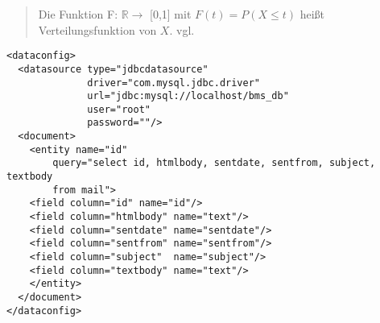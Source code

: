 \begin{quote}
	Die Funktion F: $\mathbb{R} \rightarrow$ [0,1] mit $F(t) = P (X \le t)$ heißt Verteilungsfunktion von $X$. vgl. \cite[S.55]{mf2005}
\end{quote}

\lstset{language=xml}
\begin{lstlisting}[float=!ht, frame=htrbl, caption={die datei {\normalfont \ttfamily  data-config.xml} dient als beispiel für xml quellcode}, label={lst:dataconfigxml}]
<dataconfig>
  <datasource type="jdbcdatasource" 
              driver="com.mysql.jdbc.driver"
              url="jdbc:mysql://localhost/bms_db"
              user="root" 
              password=""/>
  <document>
    <entity name="id"
        query="select id, htmlbody, sentdate, sentfrom, subject, textbody
        from mail">
    <field column="id" name="id"/>
    <field column="htmlbody" name="text"/>
    <field column="sentdate" name="sentdate"/>
    <field column="sentfrom" name="sentfrom"/>
    <field column="subject"  name="subject"/>
    <field column="textbody" name="text"/>
    </entity>
  </document>
</dataconfig>
\end{lstlisting}




